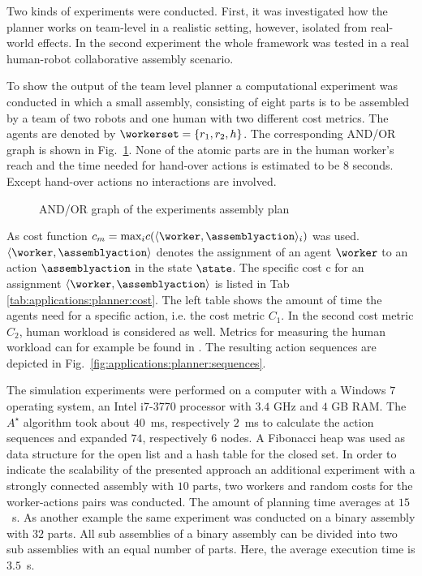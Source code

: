 Two kinds of experiments were conducted.
First, it was investigated how the planner works on team-level in a realistic setting, however, isolated from real-world effects.
In the second experiment the whole framework was tested in a real human-robot collaborative assembly scenario.

To show the output of the team level planner a computational experiment was conducted in which a small assembly, consisting of eight parts is to be assembled by a team of two robots and one human with two different cost metrics.
The agents are denoted by $\workerset=\{r_1,r_2,h\}$.
The corresponding AND/OR graph is shown in Fig.~\ref{fig:applications:planner:assembly}.
None of the atomic parts are in the human worker's reach and the time needed for hand-over actions is estimated to be $8$ seconds.
Except hand-over actions no interactions are involved.

\begin{figure}[h!]
\begin{center}

\caption{AND/OR graph of the experiments assembly plan}
\label{fig:applications:planner:assembly}
\end{center}
\end{figure}

As cost function $c_m=\text{max}_i c(\langle \worker,\assemblyaction \rangle_i)$ was used.
$\langle \worker,\assemblyaction \rangle$ denotes the assignment of an agent $\worker$ to an action $\assemblyaction$ in the state $\state$.
The specific cost c for an assignment $\langle \worker,\assemblyaction \rangle$ is listed in Tab \ref{tab:applications:planner:cost}.
The left table shows the amount of time the agents need for a specific action, i.e. the cost metric $C_1$.
In the second cost metric $C_2$, human workload is considered as well.
Metrics for measuring the human workload can for example be found in \cite{Michalos.2010}.
The resulting action sequences are depicted in Fig.~\ref{fig:applications:planner:sequences}.

The simulation experiments were performed on a computer with a Windows $7$ operating system, an Intel i7-3770 processor with $3.4$ GHz and $4$ GB RAM. The $A^\star$ algorithm took about $40$~ms, respectively $2$~ms to calculate the action sequences and expanded $74$, respectively $6$ nodes.
A Fibonacci heap was used as data structure for the open list and a hash table for the closed set.
In order to indicate the scalability of the presented approach an additional experiment with a strongly connected assembly \cite{HomemdeMello.1990} with $10$ parts, two workers and random costs for the worker-actions pairs was conducted.
The amount of planning time averages at $15$~s.
As another example the same experiment was conducted on a binary assembly with $32$ parts.
All sub assemblies of a binary assembly can be divided into two sub assemblies with an equal number of parts.
Here, the average execution time is $3.5$~s.

